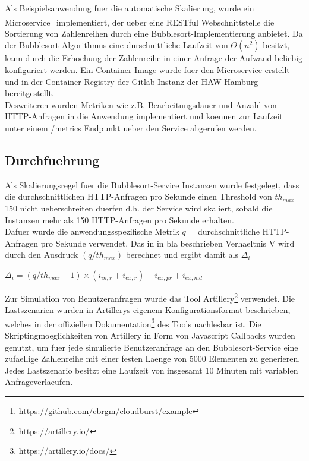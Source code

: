 \documentclass[runningheads]{llncs}
\begin{document}
Als Beispielsanwendung fuer die automatische Skalierung, wurde ein Microservice\footnote{https://github.com/cbrgm/cloudburst/example} implementiert, der ueber eine RESTful Webschnittstelle die Sortierung von Zahlenreihen durch eine Bubblesort-Implementierung anbietet. Da der Bubblesort-Algorithmus eine durschnittliche Laufzeit von $\Theta \left( n^{2}\right)$ besitzt, kann durch die Erhoehung der Zahlenreihe in einer Anfrage der Aufwand beliebig konfiguriert werden. Ein Container-Image wurde fuer den Microservice erstellt und in der Container-Registry der Gitlab-Instanz der HAW Hamburg bereitgestellt. \\

Desweiteren wurden Metriken wie z.B. Bearbeitungsdauer und Anzahl von HTTP-Anfragen in die Anwendung implementiert und koennen zur Laufzeit unter einem /metrics Endpunkt ueber den Service abgerufen werden.

\subsection{Durchfuehrung}

Als Skalierungsregel fuer die Bubblesort-Service Instanzen wurde festgelegt, dass die durchschnittlichen HTTP-Anfragen pro Sekunde einen Threshold von $th_{max}$ = 150 nicht ueberschreiten duerfen d.h. der Service  wird skaliert, sobald die Instanzen mehr als 150 HTTP-Anfragen pro Sekunde erhalten. \\

Dafuer wurde die anwendungsspezifische Metrik $q$ = durchschnittliche HTTP-Anfragen pro Sekunde verwendet.
Das in in bla beschrieben Verhaeltnis V wird durch den Ausdruck $(q/th_{max})$ berechnet und ergibt damit als $\Delta_{i}$

\begin{center}
	$\Delta_{i} = (q/th_{max}-1) \times (i_{in,r} + i_{ex,r}) - i_{ex,pr} + i_{ex,md}$
\end{center}

Zur Simulation von Benutzeranfragen wurde das Tool Artillery\footnote{https://artillery.io/} verwendet. Die Lastszenarien wurden in Artillerys eigenem Konfigurationsformat beschrieben, welches  in der offiziellen Dokumentation\footnote{https://artillery.io/docs/} des Tools nachlesbar ist. Die Skriptingmoeglichkeiten von Artillery in Form von Javascript Callbacks  wurden genutzt, um fuer jede simulierte Benutzeranfrage an den Bubblesort-Service eine zufaellige Zahlenreihe mit einer festen Laenge von 5000 Elementen zu generieren. Jedes Lastszenario besitzt eine Laufzeit von insgesamt 10 Minuten mit variablen Anfrageverlaeufen.\\
\end{document}
